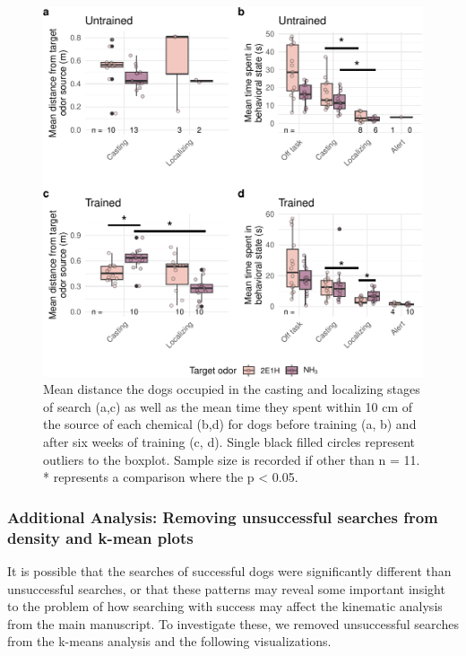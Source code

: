 \documentclass[
]{article}
\begin{document}
\begin{figure}
\centering
\includegraphics{supplementary-info_files/figure-latex/hole-times-training-1.pdf}
\caption{\label{fig:hole-times-training}Mean distance the dogs occupied in the casting and localizing stages of search (a,c) as well as the mean time they spent within 10 cm of the source of each chemical (b,d) for dogs before training (a, b) and after six weeks of training (c, d). Single black filled circles represent outliers to the boxplot. Sample size is recorded if other than n = 11. * represents a comparison where the p \textless{} 0.05.}
\end{figure}

\newpage

\hypertarget{additional-analysis-removing-unsuccessful-searches-from-density-and-k-mean-plots}{%
\subsubsection{Additional Analysis: Removing unsuccessful searches from density and k-mean plots}\label{additional-analysis-removing-unsuccessful-searches-from-density-and-k-mean-plots}}

It is possible that the searches of successful dogs were significantly different than unsuccessful searches, or that these patterns may reveal some important insight to the problem of how searching with success may affect the kinematic analysis from the main manuscript. To investigate these, we removed unsuccessful searches from the k-means analysis and the following visualizations.
\end{document}
